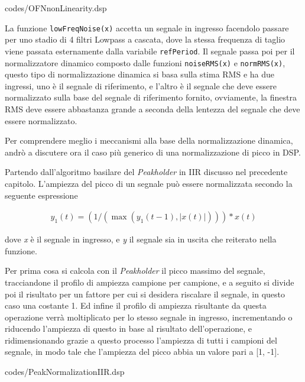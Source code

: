 \vspace{0.5cm} 

{codes/OFNnonLinearity.dsp}

La funzione \verb|lowFreqNoise(x)| accetta un segnale in ingresso
facendolo passare per uno stadio di 4 filtri Lowpass a cascata,
dove la stessa frequenza di taglio viene passata esternamente 
dalla variabile \verb|refPeriod|.
Il segnale passa poi per il normalizzatore dinamico composto dalle funzioni
\verb|noiseRMS(x)| e \verb|normRMS(x)|,
questo tipo di normalizzazione dinamica si basa sulla stima RMS e ha due ingressi,
uno è il segnale di riferimento, e l'altro è il segnale che deve essere normalizzato sulla base
del segnale di riferimento fornito, ovviamente,
la finestra RMS deve essere abbastanza grande a seconda della lentezza del
segnale che deve essere normalizzato.

Per comprendere meglio i meccanismi alla base
della normalizzazione dinamica,
andrò a discutere ora il caso più generico
di una normalizzazione di picco in DSP. 

Partendo dall'algoritmo basilare del \textit{Peakholder} in IIR discusso nel precedente capitolo. 
L'ampiezza del picco di un segnale può essere normalizzata secondo la seguente espressione 

\begin{align*}
    y_{1}(t) = (1/(\max\left( y_{1}(t\!-\!1), \left\lvert{x(t)}\right\rvert \right))) * x(t) 
\end{align*}

dove \textit{x} è il segnale in ingresso, e \textit{y} il segnale sia in uscita che reiterato nella funzione. 

Per prima cosa si calcola con il \textit{Peakholder} il picco massimo del segnale,
tracciandone il profilo di ampiezza campione per campione,
e a seguito si divide poi il risultato per 
un fattore per cui si desidera riscalare il segnale, in questo caso una costante 1.
Ed infine il profilo di ampiezza risultante da questa operazione verrà moltiplicato 
per lo stesso segnale in ingresso, incrementando o riducendo l'ampiezza di questo in base al risultato dell'operazione, 
e ridimensionando grazie a questo processo l'ampiezza di tutti i campioni del segnale, 
in modo tale che l'ampiezza del picco abbia un valore pari a [1, -1].

\vspace{0.5cm} 

{codes/PeakNormalizationIIR.dsp}

